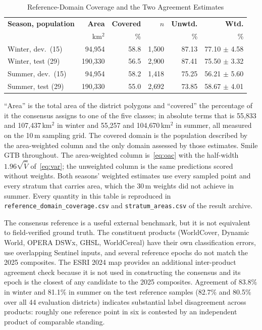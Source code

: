 \documentclass[conference]{IEEEtran}
\begin{document}
\begin{table}[!htbp]
\caption{Reference-Domain Coverage and the Two Agreement Estimates}
\label{tab_coverage}
\begin{center}
\setlength{\tabcolsep}{3pt}
\footnotesize
\begin{tabular}{@{}lrrrrr@{}}
\toprule
\textbf{Season, population} & \textbf{Area} & \textbf{Covered} & \textbf{$n$} & \textbf{Unwtd.} & \textbf{Wtd.} \\
 & km$^2$ & \% & & \% & \% \\
\midrule
Winter, dev.\ (15)  &  94{,}954 & 58.8 & 1{,}500 & 87.13 & 77.10 $\pm$ 4.58 \\
Winter, test (29)   & 190{,}330 & 56.5 & 2{,}900 & 87.41 & 75.50 $\pm$ 3.32 \\
Summer, dev.\ (15)  &  94{,}954 & 58.2 & 1{,}418 & 75.25 & 56.21 $\pm$ 5.60 \\
Summer, test (29)   & 190{,}330 & 55.0 & 2{,}692 & 73.85 & 58.67 $\pm$ 4.01 \\
\bottomrule
\end{tabular}

\vspace{2pt}
\parbox{\columnwidth}{\footnotesize ``Area'' is the total area of the district polygons and ``covered'' the percentage of it the consensus assigns to one of the five classes; in absolute terms that is 55{,}833 and 107{,}437\,km$^2$ in winter and 55{,}257 and 104{,}670\,km$^2$ in summer, all measured on the 10\,m sampling grid. The covered domain is the population described by the area-weighted column and the only domain assessed by those estimates. Smile GTB throughout. The area-weighted column is~\eqref{eq:oac} with the half-width $1.96\sqrt{\widehat{V}}$ of~\eqref{eq:var}; the unweighted column is the same predictions scored without weights. Both seasons' weighted estimates use every sampled point and every stratum that carries area, which the 30\,m weights did not achieve in summer. Every quantity in this table is reproduced in \texttt{reference\_domain\_coverage.csv} and \texttt{stratum\_areas.csv} of the result archive.}
\end{center}
\end{table}

The consensus reference is a useful external benchmark, but it is not equivalent to field-verified ground truth. The constituent products (WorldCover, Dynamic World, OPERA DSWx, GHSL, WorldCereal) have their own classification errors, use overlapping Sentinel inputs, and several reference epochs do not match the 2025 composites. The ESRI 2024 map provides an additional inter-product agreement check because it is not used in constructing the consensus and its epoch is the closest of any candidate to the 2025 composites. Agreement of 83.8\% in winter and 81.1\% in summer on the test reference samples (82.7\% and 80.5\% over all 44 evaluation districts) indicates substantial label disagreement across products: roughly one reference point in six is contested by an independent product of comparable standing.
\end{document}
